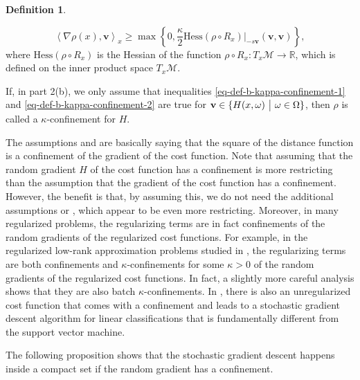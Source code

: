 \documentclass{amsart}
\newcommand{\R}{\mathbb{R}}
\newcommand{\Hess}{\mathrm{Hess}}
\newcommand{\M}{\mathcal{M}}
\theoremstyle{plain}
\theoremstyle{definition}
\newtheorem{definition}[theorem]{Definition}
\theoremstyle{remark}
\numberwithin{theorem}{section}
\numberwithin{equation}{section}
\begin{document}
\begin{definition}
\begin{enumerate}[1.]
\begin{enumerate}
\begin{itemize}
\begin{equation}
		\left\langle \nabla \rho (x),\mathbf{v} \right\rangle_x  \geq  \max\left\{0, \frac{\kappa}{2}\Hess (\rho \circ R_x)|_{-s\mathbf{v}}\left(\mathbf{v},\mathbf{v}\right)\right\},
	  \end{equation}
		where $\Hess(\rho\circ R_x)$ is the Hessian of the function $\rho\circ R_x:T_x \M \rightarrow \R$, which is defined on the inner product space $T_x \M$.
	\end{itemize}
  \end{enumerate}
  If, in part 2(b), we only assume that inequalities \eqref{eq-def-b-kappa-confinement-1} and \eqref{eq-def-b-kappa-confinement-2} are true for $\mathbf{v} \in \{H(x,\omega)~\big{|}~\omega \in \Omega\}$, then $\rho$ is called a $\kappa$-confinement for $H$.
\end{enumerate}
\end{definition}

The assumptions \cite[(5.3)]{Bottou} and \cite[Theorem 3, Assumptions 1]{Bonnabel} are basically saying that the square of the distance function is a confinement of the gradient of the cost function. Note that assuming that the random gradient $H$ of the cost function has a confinement is more restricting than the assumption that the gradient of the cost function has a confinement. However, the benefit is that, by assuming this, we do not need the additional assumptions \cite[(5.2)]{Bottou} or \cite[Theorem 3, Assumptions 2-3]{Bonnabel}, which appear to be even more restricting. Moreover, in many regularized problems, the regularizing terms are in fact confinements of the random gradients of the regularized cost functions. For example, in the regularized low-rank approximation problems studied in \cite{XYW-2024,YXW-2024}, the regularizing terms are both confinements and $\kappa$-confinements for some $\kappa>0$ of the random gradients of the regularized cost functions. In fact, a slightly more careful analysis \cite{Yang} shows that they are also batch $\kappa$-confinements. In \cite{XW-2026}, there is also an unregularized cost function that comes with a confinement and leads to a stochastic gradient descent algorithm for linear classifications that is fundamentally different from the support vector machine. 

The following proposition shows that the stochastic gradient descent happens inside a compact set if the random gradient has a confinement. 
\end{document}

